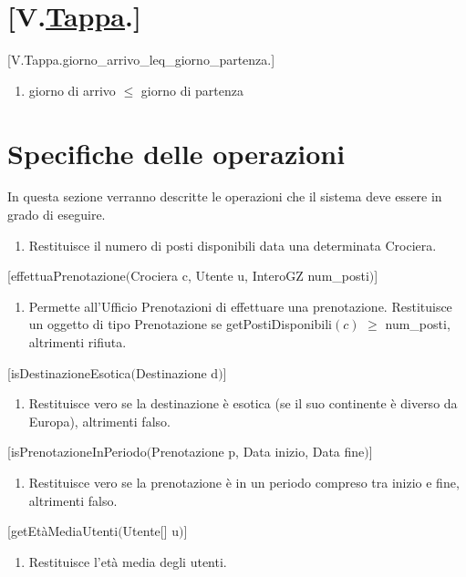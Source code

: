 \documentclass{article}
\begin{document}
\section*{[V.\hyperref[sec:Tappa]{Tappa}.]}
    [V.Tappa.giorno\_arrivo\_leq\_giorno\_partenza.]
    \begin{enumerate}
        \item giorno di arrivo $\leq$ giorno di partenza
    \end{enumerate}

\newpage
\section{Specifiche delle operazioni}

In questa sezione verranno descritte le operazioni che il sistema deve essere in grado di eseguire.
\begin{enumerate}
    \item Restituisce il numero di posti disponibili data una determinata Crociera.
\end{enumerate}
\space

[effettuaPrenotazione$($Crociera c, Utente u, InteroGZ num\_posti$)$]
\begin{enumerate}
    \item Permette all'Ufficio Prenotazioni di effettuare una prenotazione. Restituisce un oggetto di tipo Prenotazione se getPostiDisponibili$(c)$ $\geq$ num\_posti, altrimenti rifiuta.
\end{enumerate}

[isDestinazioneEsotica$($Destinazione d$)$]
\begin{enumerate}
    \item Restituisce vero se la destinazione è esotica (se il suo continente è diverso da Europa), altrimenti falso.
\end{enumerate}
\space

[isPrenotazioneInPeriodo$($Prenotazione p, Data inizio, Data fine$)$]
\begin{enumerate}
    \item Restituisce vero se la prenotazione è in un periodo compreso tra inizio e fine, altrimenti falso.
\end{enumerate}
\space

[getEtàMediaUtenti$($Utente[] u$)$]
\begin{enumerate}
    \item Restituisce l'età media degli utenti.
\end{enumerate}
\space
\end{document}
